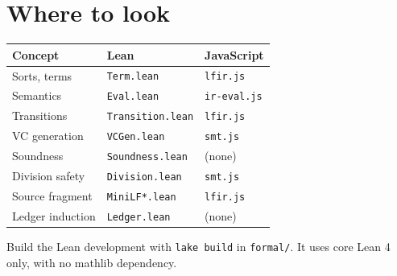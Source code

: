 \documentclass[11pt,a4paper]{article}
\newcommand{\code}[1]{\texttt{#1}}
\theoremstyle{definition}
\theoremstyle{plain}
\theoremstyle{remark}
\begin{document}
\section{Where to look}

\begin{center}
\begin{tabular}{@{}lll@{}}
\toprule
Concept & Lean & JavaScript \\
\midrule
Sorts, terms      & \code{Term.lean}       & \code{lfir.js} \\
Semantics         & \code{Eval.lean}       & \code{ir-eval.js} \\
Transitions       & \code{Transition.lean} & \code{lfir.js} \\
VC generation     & \code{VCGen.lean}      & \code{smt.js} \\
Soundness         & \code{Soundness.lean}  & (none) \\
Division safety   & \code{Division.lean}   & \code{smt.js} \\
Source fragment   & \code{MiniLF*.lean}    & \code{lfir.js} \\
Ledger induction  & \code{Ledger.lean}     & (none) \\
\bottomrule
\end{tabular}
\end{center}

\noindent
Build the Lean development with \code{lake build} in \code{formal/}. It uses
core Lean 4 only, with no mathlib dependency.
\end{document}
